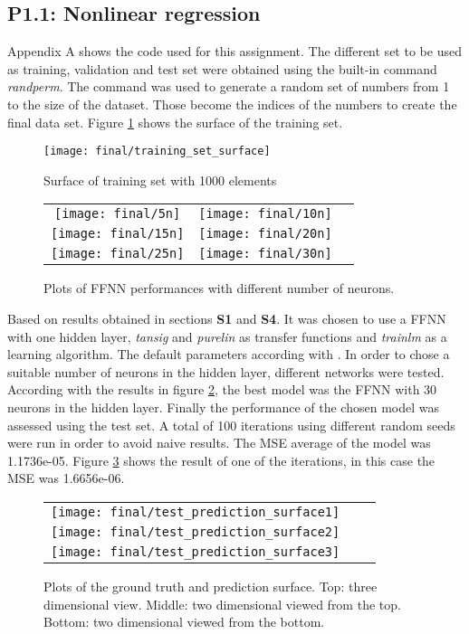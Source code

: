 \subsection{P1.1: Nonlinear regression}
Appendix A shows the code used for this assignment. The different set to be used as training, validation and test set were obtained using the built-in command \textit{randperm}. The command was used to generate a random set of numbers from 1 to the size of the dataset. Those become the indices of the numbers to create the final data set. Figure \ref{final_2_1} shows the surface of the training set.
\begin{figure}[!htbp]
\caption{Surface of training set with 1000 elements}
\label{final_2_1}
\medbreak
\texttt{[image: final/training\_set\_surface]}
\centering
\end{figure}

\begin{figure}[!htbp]
\caption{Plots of FFNN performances with different number of neurons.}
\label{final_2_2}
\medbreak
\begin{tabular}{ccc}
\texttt{[image: final/5n]} &
\texttt{[image: final/10n]}\\
\texttt{[image: final/15n]} &
\texttt{[image: final/20n]} \\
\texttt{[image: final/25n]} &
\texttt{[image: final/30n]}
\end{tabular}
\centering
\end{figure}

\bigbreak
Based on results obtained in sections \textbf{S1} and \textbf{S4}. It was chosen to use a FFNN with one hidden layer, \textit{tansig} and \textit{purelin} as transfer functions and \textit{trainlm} as a learning algorithm. The default parameters according with \cite{matlab_2}. In order to chose a suitable number of neurons in the hidden layer, different networks were tested. According with the results in figure \ref{final_2_2}, the best model was the FFNN with 30 neurons in the hidden layer.
\bigbreak
Finally the performance of the chosen model was assessed using the test set. A total of 100 iterations using different random seeds were run in order to avoid naive results. The MSE average of the model was 1.1736e-05. Figure \ref{final_2_3} shows the result of one of the iterations, in this case the MSE was 1.6656e-06.

\begin{figure}[!htbp]
\caption{Plots of the ground truth and prediction surface. Top: three dimensional view. Middle: two dimensional viewed from the top. Bottom: two dimensional viewed from the bottom.}
\label{final_2_3}
\begin{tabular}{ccc}
\texttt{[image: final/test\_prediction\_surface1]} \\
\texttt{[image: final/test\_prediction\_surface2]} \\
\texttt{[image: final/test\_prediction\_surface3]}
\end{tabular}
\centering
\end{figure}

